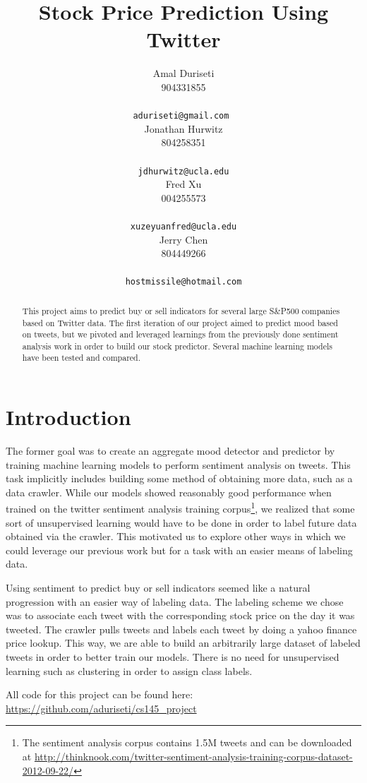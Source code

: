 \documentclass[11pt,a4paper]{article}
\title{Stock Price Prediction Using Twitter}
\author{Amal Duriseti \\
	 904331855 \\
	 \\
	\small{\tt aduriseti@gmail.com } \\\And
	Jonathan Hurwitz \\
	804258351 \\
	 \\
	\small{\tt jdhurwitz@ucla.edu} \\\And
	Fred Xu \\
	004255573 \\
	 \\
	\small{\tt xuzeyuanfred@ucla.edu} \\\And
	 Jerry Chen \\
	 804449266 \\
	 \\
	\small{\tt hostmissile@hotmail.com} \\
}
\date{}
\begin{document}
	\maketitle
	\begin{abstract}
	This project aims to predict buy or sell indicators for several large S\&P500 companies based on Twitter data. The first iteration of our project aimed to predict mood based on tweets, but we pivoted and leveraged learnings from the previously done sentiment analysis work in order to build our stock predictor. Several machine learning models have been tested and compared.
	\end{abstract}
	

\section{Introduction}
The former goal was to create an aggregate mood detector and predictor by training machine learning models to perform sentiment analysis on tweets. This task implicitly includes building some method of obtaining more data, such as a data crawler. While our models showed reasonably good performance when trained on the twitter sentiment analysis training corpus\footnote{The sentiment analysis corpus contains 1.5M tweets and can be downloaded at \url{http://thinknook.com/twitter-sentiment-analysis-training-corpus-dataset-2012-09-22/}}, we realized that some sort of unsupervised learning would have to be done in order to label future data obtained via the crawler. This motivated us to explore other ways in which we could leverage our previous work but for a task with an easier means of labeling data.
\par
Using sentiment to predict buy or sell indicators seemed like a natural progression with an easier way of labeling data. The labeling scheme we chose was to associate each tweet with the corresponding stock price on the day it was tweeted. The crawler pulls tweets and labels each tweet by doing a yahoo finance price lookup. This way, we are able to build an arbitrarily large dataset of labeled tweets in order to better train our models. There is no need for unsupervised learning such as clustering in order to assign class labels.
\par
All code for this project can be found here: \url{https://github.com/aduriseti/cs145_project}
\end{document}

